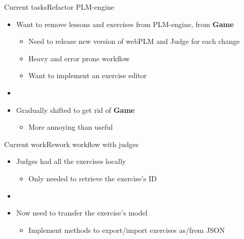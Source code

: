 \documentclass{beamer}
\begin{document}
\begin{frame}{Current tasks}{Refactor PLM-engine}
  \begin{itemize}
  \item {
    Want to remove lessons and exercises from PLM-engine, from \textbf{Game}
    \begin{itemize}
    \item {
      Need to release new version of webPLM and Judge for each change
    }
    \item {
      Heavy and error prone workflow
    }
    \item {
      Want to implement an exercise editor
    }
    \end{itemize}
    \pause
  }
  \item[~]
  \item {
    Gradually shifted to get rid of \textbf{Game}
    \begin{itemize}
    \item {
      More annoying than useful
    }
    \end{itemize}
  }
  \end{itemize}
\end{frame}

\begin{frame}{Current work}{Rework workflow with judges}
  \begin{itemize}
  \item {
    Judges had all the exercises locally
    \begin{itemize}
    \item {
      Only needed to retrieve the exercise's ID
    }
    \end{itemize}
    \pause
  }
  \item[~]
  \item {
    Now need to transfer the exercise's model
    \begin{itemize}
    \item {
      Implement methods to export/import exercises as/from JSON
    }
    \end{itemize}
  }
  \end{itemize}
\end{frame}
\end{document}
